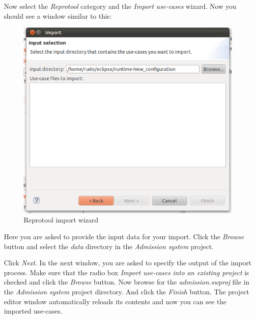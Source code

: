 Now select the \emph{Reprotool} category and the \emph{Import use-cases} wizard. Now you should see a window similar to this:

\newpage

\begin{figure}[ht]
  \centering
  \includegraphics{images/reprotoolImportWizard}
  \caption{Reprotool import wizard}
  \label{fig:reprotoolImportWizard}
\end{figure}

Here you are asked to provide the input data for your import. Click the \emph{Browse} button and select the \emph{data} directory
in the \emph{Admission system} project.

Click \emph{Next}. In the next window, you are asked to specify the output of the import process. Make sure that the radio box
\emph{Import use-cases into an existing project} is checked and click the \emph{Browse} button. Now browse for the
\emph{admission.swproj} file in the \emph{Admission system} project directory. And click the \emph{Finish} button. The project
editor window automatically reloads its contents and now you can see the imported use-cases.
